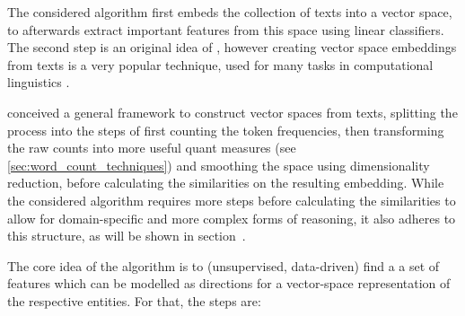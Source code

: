 

The considered algorithm first embeds the collection of texts into a vector space, to afterwards extract important features from this space using linear classifiers. The second step is an original idea of \cite{Derrac2015}, however creating vector space embeddings from texts is a very popular technique, used for many tasks in computational linguistics \cite{Mikolov:Regularities,Mikolov2013a,Guo,Lowe,Turney2010}. %

 \textcite{Lowe} conceived a general framework to construct vector spaces from texts, splitting the process into the steps of first counting the token frequencies, then transforming the raw counts into more useful \gls{quant} measures (see \ref{sec:word_count_techniques}) %
  and smoothing the space using dimensionality reduction, before calculating the similarities on the resulting embedding. While the considered algorithm requires more steps before calculating the similarities to allow for domain-specific and more complex forms of reasoning, it also adheres to this structure, as will be shown in section~.

The core idea of the algorithm is to (unsupervised, data-driven) find a a set of features which can be modelled as directions for a vector-space representation of the respective entities. For that, the steps are:

